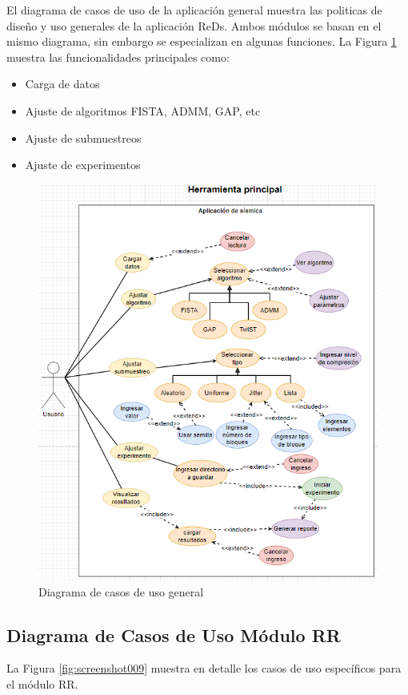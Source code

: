 \documentclass[12pt,twoside,letter]{ol-softwaremanual}
\begin{document}
El diagrama de casos de uso de la aplicación general muestra las politicas de diseño y uso generales de la aplicación ReDs. Ambos módulos se basan en el mismo diagrama, sin embargo se especializan en algunas funciones. La Figura \ref{fig:screenshot008} muestra las funcionalidades principales como:

\begin{itemize}
	\item Carga de datos
	\item Ajuste de algoritmos FISTA, ADMM, GAP, etc
	\item Ajuste de submuestreos
	\item Ajuste de experimentos
\end{itemize}

\begin{figure}
	\centering
	\includegraphics[width=0.7\linewidth]{figures/screenshot008}
	\caption{Diagrama de casos de uso general}
	\label{fig:screenshot008}
\end{figure}

\subsection{Diagrama de Casos de Uso Módulo RR}

La Figura \ref{fig:screenshot009} muestra en detalle los casos de uso específicos para el módulo RR.
\end{document}
